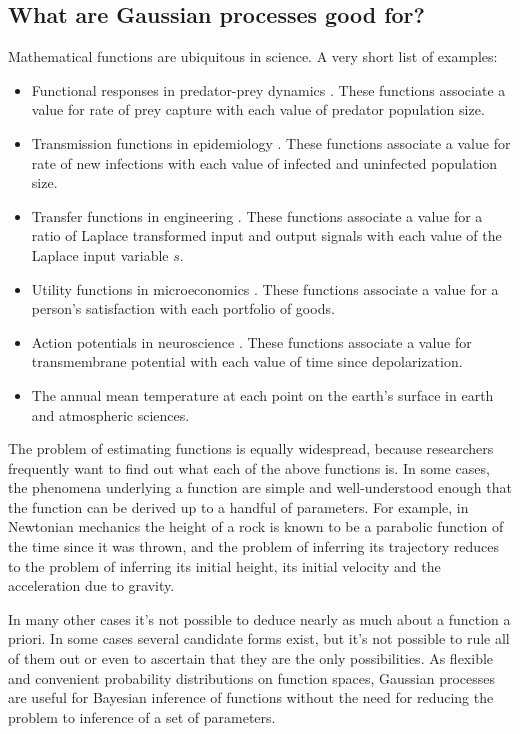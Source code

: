 \subsection{What are Gaussian processes good for?}\label{sub:applications}
Mathematical functions are ubiquitous in science. A very short list of examples:
\begin{itemize}
    \item Functional responses in predator-prey dynamics \cite{mathecol}. These functions associate a value for rate of prey capture with each value of predator population size.
    \item Transmission functions in epidemiology \cite{andersonmay}. These functions associate a value for rate of new infections with each value of infected and uninfected population size.
    \item Transfer functions in engineering \cite{duffy}. These functions associate a value for a ratio of Laplace transformed input and output signals with each value of the Laplace input variable $s$.
    \item Utility functions in microeconomics \cite{microecon}. These functions associate a value for a person's satisfaction with each portfolio of goods.
    \item Action potentials in neuroscience \cite{neuro}. These functions associate a value for transmembrane potential with each value of time since depolarization.
    \item The annual mean temperature at each point on the earth's surface in earth and atmospheric sciences.
\end{itemize}

The problem of estimating functions is equally widespread, because researchers frequently want to find out what each of the above functions is. In some cases, the phenomena underlying a function are simple and well-understood enough that the function can be derived up to a handful of parameters. For example, in Newtonian mechanics the height of a rock is known to be a parabolic function of the time since it was thrown, and the problem of inferring its trajectory reduces to the problem of inferring its initial height, its initial velocity and the acceleration due to gravity.

In many other cases it's not possible to deduce nearly as much about a function a priori. In some cases several candidate forms exist, but it's not possible to rule all of them out or even to ascertain that they are the only possibilities. As flexible and convenient probability distributions on function spaces, Gaussian processes are useful for Bayesian inference of functions without the need for reducing the problem to inference of a set of parameters.

